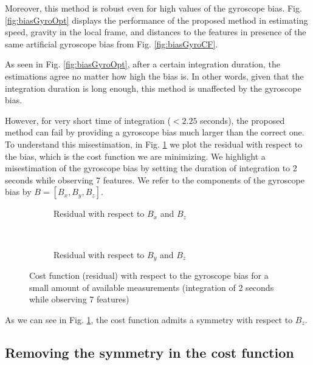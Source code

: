 \documentclass[letterpaper, 10 pt, journal, final]{ieeeconf}  %
\begin{document}
Moreover, this method is robust even for high values of the gyroscope bias.
Fig. \ref{fig:biasGyroOpt} displays the performance of the proposed method in estimating speed, gravity in the local frame, and distances to the features in presence of the same artificial gyroscope bias from Fig. \ref{fig:biasGyroCF}.

As seen in Fig. \ref{fig:biasGyroOpt}, after a certain integration duration, the estimations agree no matter how high the bias is.
In other words, given that the integration duration is long enough, this method is unaffected by the gyroscope bias.

However, for very short time of integration ($<2.25$ seconds), the proposed method can fail by providing a gyroscope bias much larger than the correct one.
To understand this misestimation, in Fig. \ref{fig:cost} we plot the residual with respect to the bias, which is the cost function we are minimizing.
We highlight a misestimation of the gyroscope bias by setting the duration of integration to 2 seconds while observing 7 features.
We refer to the components of the gyroscope bias by $B = [B_x, B_y, B_z]$.

\begin{figure}
        \centering
        \begin{subfigure}[b]{0.489\columnwidth}
                \resizebox{\columnwidth}{!}{}
                \caption{Residual with respect to $B_x$ and $B_z$}
        \end{subfigure}~
        \begin{subfigure}[b]{0.489\columnwidth}
                \resizebox{\columnwidth}{!}{}
                \caption{Residual with respect to $B_y$ and $B_z$}
        \end{subfigure}
        \caption{Cost function (residual) with respect to the gyroscope bias for a small amount of available measurements (integration of 2 seconds while observing 7 features)\label{fig:cost}}
\end{figure}

As we can see in Fig. \ref{fig:cost}, the cost function admits a symmetry with respect to $B_z$.

\subsection{Removing the symmetry in the cost function}
\end{document}
